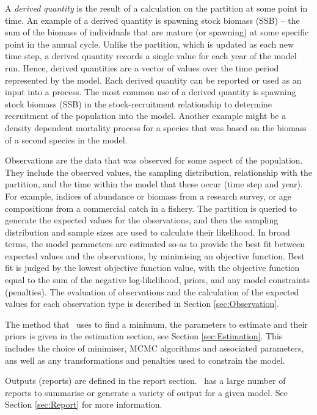 A \emph{derived quantity} is the result of a calculation on the partition at some point in time. An example of a derived quantity is spawning stock biomass (SSB) -- the sum of the biomass of individuals that are mature (or spawning) at some specific point in the annual cycle. Unlike the partition, which is updated as each new time step, a derived quantity records a single value for each year of the model run. Hence, derived quantities are a vector of values over the time period represented by the model. Each derived quantity can be reported or used as an input into a process. The most common use of a derived quantity is spawning stock biomass (SSB) in the stock-recruitment relationship to determine recruitment of the population into the model. Another example might be a density dependent mortality process for a species that was based on the biomass of a second species in the model.

Observations are the data that was observed for some aspect of the population. They include the observed values, the sampling distribution, relationship with the partition, and the time within the model that these occur (time step and year). For example, indices of abundance or biomass from a research survey, or age compositions from a commercial catch in a fishery. The partition is queried to generate the expected values for the observations, and then the sampling distribution and sample sizes are used to calculate their likelihood. In broad terms, the model parameters are estimated so-as to provide the best fit between expected values and the observations, by minimising an objective function. Best fit is judged by the lowest objective function value, with the objective function equal to the sum of the negative log-likelihood, priors, and any model constraints (penalties). The evaluation of observations and the calculation of the expected values for each observation type is described in Section \ref{sec:Observation}.

The method that \CNAME\ uses to find a minimum, the parameters to estimate and their priors is given in the estimation section, see Section \ref{sec:Estimation}. This includes the choice of minimiser, MCMC algorithms and associated parameters, ans well as any transformations and penalties used to constrain the model. 

Outputs (reports) are defined in the report section. \CNAME\  has a large number of reports to summarise or generate a variety of output for a given model. See Section \ref{sec:Report} for more information.

